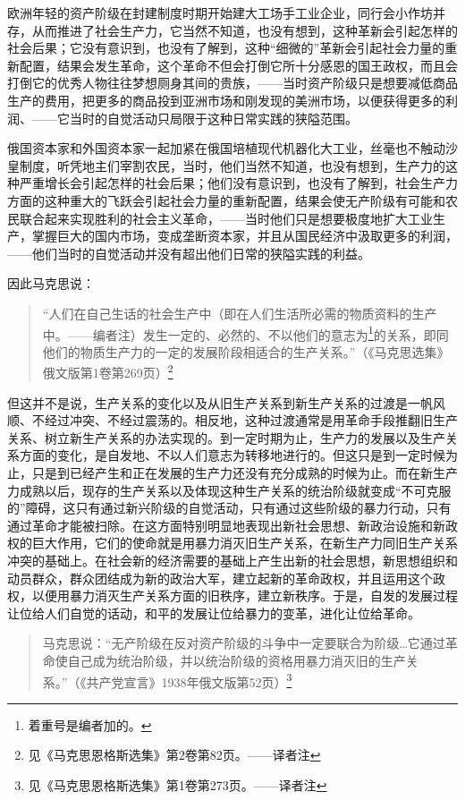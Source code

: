 欧洲年轻的资产阶级在封建制度时期开始建大工场手工业企业，同行会小作坊并存，从而推进了社会生产力，它当然不知道，也没有想到，这种革新会引起怎样的社会后果；它没有意识到，也没有了解到，这种“细微的”革新会引起社会力量的重新配置，结果会发生革命，这个革命不但会打倒它所十分感恩的国王政权，而且会打倒它的优秀人物往往梦想厕身其间的贵族，——当时资产阶级只是想要减低商品生产的费用，把更多的商品投到亚洲市场和刚发现的美洲市场，以便获得更多的利润、——它当时的自觉活动只局限于这种日常实践的狭隘范围。

俄国资本家和外国资本家一起加紧在俄国培植现代机器化大工业，丝毫也不触动沙皇制度，听凭地主们宰割农民，当时，他们当然不知道，也没有想到，生产力的这种严重增长会引起怎样的社会后果；他们没有意识到，也没有了解到，社会生产力方面的这种重大的飞跃会引起社会力量的重新配置，结果会使无产阶级有可能和农民联合起来实现胜利的社会主义革命，——当时他们只是想要极度地扩大工业生产，掌握巨大的国内市场，变成垄断资本家，并且从国民经济中汲取更多的利润，——他们当时的自觉活动并没有超出他们日常的狭隘实践的利益。

因此马克思说：

\begin{quotation}
“人们在自己生话的社会生产中（即在人们生活所必需的物质资料的生产中。——编者注）发生一定的、必然的、不以他们的意志为\footnote{着重号是编者加的。}的关系，即同他们的物质生产力的一定的发展阶段相适合的生产关系。”（《马克思选集》俄文版第1卷第269页）\footnote{见《马克思恩格斯选集》第2卷第82页。——译者注}
\end{quotation}

但这并不是说，生产关系的变化以及从旧生产关系到新生产关系的过渡是一帆风顺、不经过冲突、不经过震荡的。相反地，这种过渡通常是用革命手段推翻旧生产关系、树立新生产关系的办法实现的。到一定时期为止，生产力的发展以及生产关系方面的变化，是自发地、不以人们意志为转移地进行的。但这只是到一定时候为止，只是到已经产生和正在发展的生产力还没有充分成熟的时候为止。而在新生产力成熟以后，现存的生产关系以及体现这种生产关系的统治阶级就变成“不可克服的”障碍，这只有通过新兴阶级的自觉活动，只有通过这些阶级的暴力行动，只有通过革命才能被扫除。在这方面特别明显地表现出新社会思想、新政治设施和新政权的巨大作用，它们的使命就是用暴力消灭旧生产关系，在新生产力同旧生产关系冲突的基础上。在社会新的经济需要的基础上产生出新的社会思想，新思想组织和动员群众，群众团结成为新的政治大军，建立起新的革命政权，并且运用这个政权，以便用暴力消灭生产关系方面的旧秩序，建立新秩序。于是，自发的发展过程让位给人们自觉的话动，和平的发展让位给暴力的变革，进化让位给革命。

\begin{quotation}
马克思说：“无产阶级在反对资产阶级的斗争中一定要联合为阶级…它通过革命使自己成为统治阶级，并以统治阶级的资格用暴力消灭旧的生产关系。”（《共产党宣言》1938年俄文版第52页）\footnote{见《马克思恩格斯选集》第1卷第273页。——译者注}
\end{quotation}

